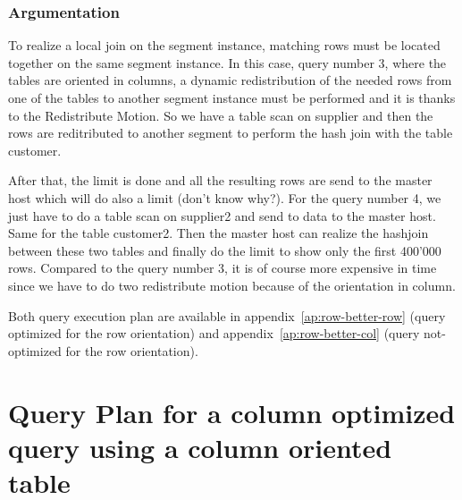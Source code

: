 \documentclass[a4paper,11pt]{report}
\begin{document}
\subsection*{Argumentation}

To realize a local join on the segment instance, matching rows must be located
together on the same segment instance. In this case, query number 3, where the
tables are oriented in columns, a dynamic redistribution of the needed rows from
one of the tables to another segment instance must be performed and it is thanks
to the Redistribute Motion. So we have a table scan on supplier and then the
rows are reditributed to another segment to perform the hash join with the table
customer.

After that, the limit is done and all the resulting rows are send to
the master host which will do also a limit (don't know why?). For the query
number 4, we just have to do a table scan on supplier2 and send to data to the
master host. Same for the table customer2. Then the master host can realize the
hashjoin between these two tables and finally do the limit to show only the
first 400'000 rows. Compared to the query number 3, it is of course more
expensive in time since we have to do two redistribute motion because of the
orientation in column.

Both query execution plan are available in appendix~\ref{ap:row-better-row}
(query optimized for the row orientation) and appendix~\ref{ap:row-better-col}
(query not-optimized for the row orientation).

\appendix

\chapter{Query Plan for a column optimized query using a column oriented table}
\label{ap:col-better-col}
\end{document}
